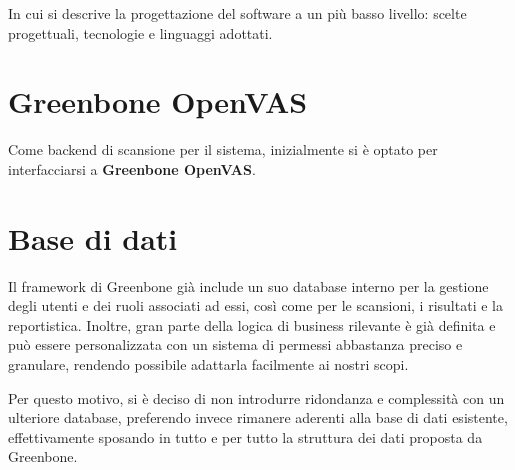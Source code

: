 In cui si descrive la progettazione del software a un più basso livello: scelte progettuali, tecnologie e linguaggi adottati.

\section{Greenbone OpenVAS}
Come backend di scansione per il sistema, inizialmente si è optato per interfacciarsi a \textbf{Greenbone OpenVAS}.

\section{Base di dati}
Il framework di Greenbone già include un suo database interno per la gestione degli utenti e dei ruoli associati ad essi, così come per le scansioni, i risultati e la reportistica. Inoltre, gran parte della logica di business rilevante è già definita e può essere personalizzata con un sistema di permessi abbastanza preciso e granulare, rendendo possibile adattarla facilmente ai nostri scopi.

Per questo motivo, si è deciso di non introdurre ridondanza e complessità con un ulteriore database, preferendo invece rimanere aderenti alla base di dati esistente, effettivamente sposando in tutto e per tutto la struttura dei dati proposta da Greenbone.

